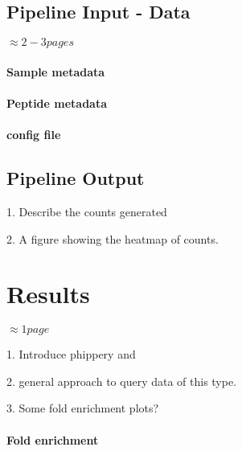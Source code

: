 \documentclass{article}
\begin{document}
\subsection*{Pipeline Input - Data}

$\approx 2 - 3 pages$

\paragraph{Sample metadata}
\paragraph{Peptide metadata}
\paragraph{config file}

\subsection*{Pipeline Output}

1. Describe the counts generated

2. A figure showing the heatmap of counts.


\section*{Results}

$\approx 1 page$

1. Introduce phippery and 

2. general approach to query data of this type.

3. Some fold enrichment plots?


\paragraph{Fold enrichment}
\end{document}
